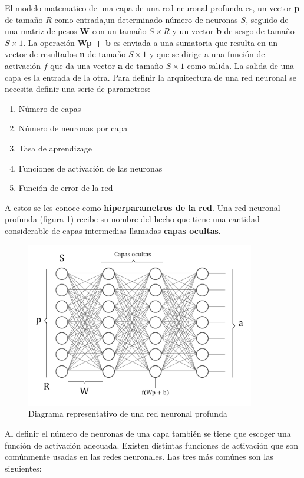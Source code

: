 \documentclass{article}
\begin{document}
El modelo matematico de una capa de una red neuronal profunda es, un vector \textbf{p} de tamaño $R$ como entrada,un determinado número de neuronas $S$, seguido de una matriz de pesos \textbf{W} con un tamaño $S\times$$R$ y un vector \textbf{b} de sesgo de tamaño $S\times1$. 
La operación \textbf{Wp + b} es enviada a una sumatoria que resulta en un vector de resultados \textbf{n} de tamaño $S\times1$ y que se dirige a una función de activación $f$ que da una vector \textbf{a} de tamaño $S\times1$ como salida. La salida de una capa es la entrada de la otra.
Para definir la arquitectura de una red neuronal se necesita definir una serie de parametros:
\begin{enumerate}
    \item Número de capas
    \item Número de neuronas por capa
    \item Tasa de aprendizage
    \item Funciones de activación de las neuronas
    \item Función de error de la red
\end{enumerate}
A estos se les conoce como \textbf{hiperparametros de la red}. Una red neuronal profunda (figura \ref{multi}) recibe su nombre del hecho que tiene una cantidad considerable de capas intermedias llamadas \textbf{capas ocultas}.
\begin{figure}[H]
    \centering
    \includegraphics[width=100mm]{multi.png}
    \caption{Diagrama representativo de una red neuronal profunda}
    \label{multi}
\end{figure}
Al definir el número de neuronas de una capa también se tiene que escoger una función de activación adecuada.
Existen distintas funciones de activación que son comúnmente usadas en las redes neuronales. Las tres más comúnes son las siguientes:  \\
$$
\end{document}
